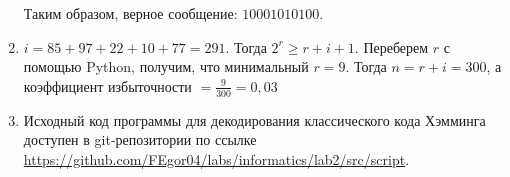 \begin{enumerate}
    Таким образом, верное сообщение: $10001010100$.

    \item $i = 85 + 97 + 22 + 10 + 77 = 291$. Тогда $2^r \geqslant r + i + 1$. Переберем $r$ с помощью Python, получим,
    что минимальный $r = 9$. Тогда $n = r + i = 300$, а коэффициент избыточности $= \frac{9}{300} = 0{,}03$


    \item Исходный код программы для декодирования классического кода Хэмминга доступен в git-репозитории по ссылке
    \url{https://github.com/FEgor04/labs/informatics/lab2/src/script}.
\end{enumerate}